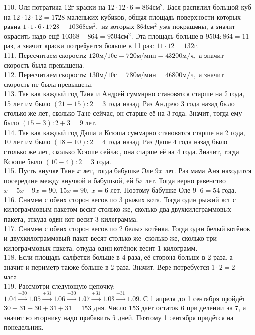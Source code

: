 110. Оля потратила 12г краски на $12\cdot12\cdot6=864\text{см}^2.$ Вася распилил большой куб на $12\cdot12\cdot12=1728$ маленьких кубиков, общая площадь поверхности которых равна $1\cdot1\cdot6\cdot1728=10368\text{см}^2,$ из которых $864\text{см}^2$ уже покрашены, а значит окрасить надо ещё $10368-864=9504\text{см}^2.$ Эта площадь больше в $9504:864=11$ раз, а значит краски потребуется больше в 11 раз: $11\cdot12=132$г.\\
111. Пересчитаем скорость: $120\text{м}/10\text{с}=720\text{м}/\text{мин}=43200\text{м}/\text{ч},$ а значит скорость была превышена.\\
112. Пересчитаем скорость: $130\text{м}/10\text{с}=780\text{м}/\text{мин}=46800\text{м}/\text{ч},$ а значит скорость не была превышена.\\
113. Так как каждый год Таня и Андрей суммарно становятся старше на 2 года, 15 лет им было $(21-15):2=3$ года назад. Раз Андрею 3 года назад было столько же лет, сколько Тане сейчас, он старше её на 3 года. Значит, тогда ему было $(15-3):2+3=9$ лет.\\
114. Так как каждый год Даша и Ксюша суммарно становятся старше на 2 года, 10 лет им было $(18-10):2=4$ года назад. Раз Даше 4 года назад было столько же лет, сколько Ксюше сейчас, она старше её на 4 года. Значит, тогда Ксюше было $(10-4):2=3$ года.\\
115. Пусть внучке Тане $x$ лет, тогда бабушке Оле $9x$ лет. Раз мама Аня находится посередине между внучкой и бабушкой, ей $5x$ лет. Тогда верно равенство $x+5x+9x=90,\ 15x=90,\ x=6$ лет. Поэтому бабушке Оле $9\cdot6=54$ года.\\
116. Снимем с обеих сторон весов по 3 рыжих кота. Тогда один рыжий кот с килограммовым пакетом весит столько же, сколько два двухкилограммовых пакета, откуда один кот весит 3 килограмма.\\
117. Снимем с обеих сторон весов по 2 белых котёнка. Тогда один белый котёнок и двухкилограммовый пакет весят столько же, сколько же, сколько три килограммовых пакета, откуда один котёнок весит 1 килограмм.\\
118. Если площадь салфетки больше в 4 раза, её сторона больше в 2 раза, а значит и периметр также больше в 2 раза. Значит, Вере потребуется $1\cdot2=2$ часа.\\
119. Рассмотри следующую цепочку: $1.04\stackrel{+30}{\rightarrow}1.05\stackrel{+31}{\rightarrow}1.06\stackrel{+30}{\rightarrow}1.07\stackrel{+31}{\rightarrow}1.08\stackrel{+31}{\rightarrow}1.09.$
С 1 апреля до 1 сентября пройдёт $30+31+30+31+31=153$ дня. Число 153 даёт остаток 6 при делении на 7, а значит ко вторнику надо прибавить 6 дней. Поэтому 1 сентября придётся на понедельник.\\

